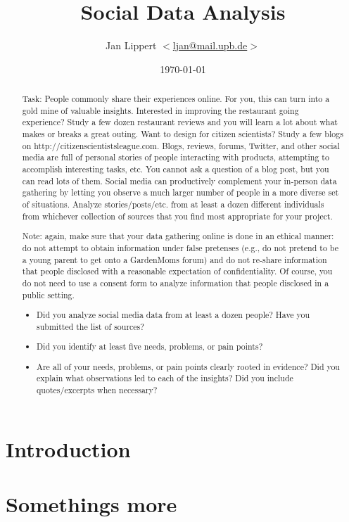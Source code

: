 \documentclass[journal,10pt]{IEEEtran}
\title{Social Data Analysis}
\author{Jan Lippert \(<\)\href{mailt:ljan@mail.upb.de}{ljan@mail.upb.de}\(>\)}
\date{\today}
\begin{document}
\begin{abstract}
Task: People commonly share their experiences online.  For you, this can turn into a gold mine of valuable insights.  Interested in improving the restaurant going experience?  Study a few dozen restaurant reviews and you will learn a lot about what makes or breaks a great outing.  Want to design for citizen scientists?  Study a few blogs on http://citizenscientistsleague.com.  Blogs, reviews, forums, Twitter, and other social media are full of personal stories of people interacting with products, attempting to accomplish interesting tasks, etc.  You cannot ask a question of a blog post, but you can read lots of them.  Social media can productively complement your in-person data gathering by letting you observe a much larger number of people in a more diverse set of situations.   Analyze stories/posts/etc. from at least a dozen different individuals from whichever collection of sources that you find most appropriate for your project.

Note: again, make sure that your data gathering online is done in an ethical manner: do not attempt to obtain information under false pretenses (e.g., do not pretend to be a young parent to get onto a GardenMoms forum) and do not re-share information that people disclosed with a reasonable expectation of confidentiality.  Of course, you do not need to use a consent form to analyze information that people disclosed in a public setting.

\begin{itemize}
  \item Did you analyze social media data from at least a dozen people?  Have you submitted the list of sources?
  \item Did you identify at least five needs, problems, or pain points?
  \item Are all of your needs, problems, or pain points clearly rooted in evidence?  Did you explain what observations led to each of the insights? Did you include quotes/excerpts when necessary?
\end{itemize}
\end{abstract}

\maketitle

\section{Introduction}
\section{Somethings more}

  

\end{document}
